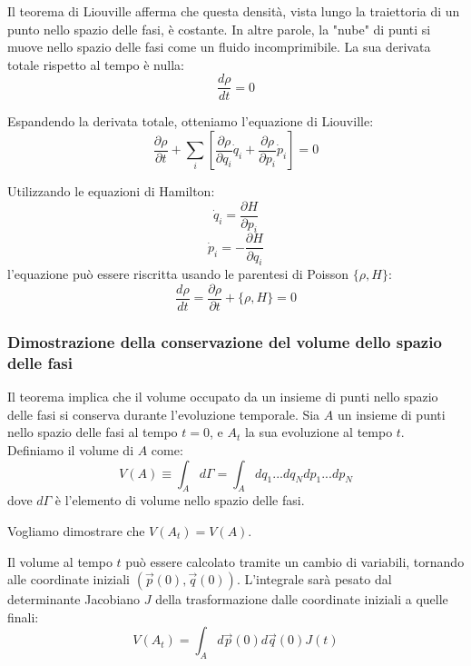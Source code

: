 Il teorema di Liouville afferma che questa densità, vista lungo la traiettoria di un punto nello spazio delle fasi, è costante. In altre parole, la "nube" di punti si muove nello spazio delle fasi come un fluido incomprimibile. La sua derivata totale rispetto al tempo è nulla:
\begin{equation}
    \frac{d\rho}{dt} = 0
    \label{eq:derivata_totale_rho}
\end{equation}

Espandendo la derivata totale, otteniamo l'equazione di Liouville:
\begin{equation}
    \frac{\partial\rho}{\partial t} + \sum_{i} \left[ \frac{\partial\rho}{\partial q_i}\dot{q}_i + \frac{\partial\rho}{\partial p_i}\dot{p}_i \right] = 0
    \label{eq:liouville_espansa}
\end{equation}

Utilizzando le equazioni di Hamilton:
\begin{equation}
    \dot{q}_i = \frac{\partial H}{\partial p_i}
    \label{eq:hamilton_q}
\end{equation}
\begin{equation}
    \dot{p}_i = -\frac{\partial H}{\partial q_i}
    \label{eq:hamilton_p}
\end{equation}
l'equazione può essere riscritta usando le parentesi di Poisson $\{\rho, H\}$:
\begin{equation}
    \frac{d\rho}{dt} = \frac{\partial\rho}{\partial t} + \{\rho, H\} = 0
    \label{eq:liouville_poisson}
\end{equation}

\subsubsection{Dimostrazione della conservazione del volume dello spazio delle fasi}

Il teorema implica che il volume occupato da un insieme di punti nello spazio delle fasi si conserva durante l'evoluzione temporale. Sia $A$ un insieme di punti nello spazio delle fasi al tempo $t=0$, e $A_t$ la sua evoluzione al tempo $t$. Definiamo il volume di $A$ come:
\begin{equation}
    V(A) \equiv \int_A d\Gamma = \int_A dq_1...dq_N dp_1...dp_N
    \label{eq:volume_A}
\end{equation}
dove $d\Gamma$ è l'elemento di volume nello spazio delle fasi.

Vogliamo dimostrare che $V(A_t) = V(A)$.

Il volume al tempo $t$ può essere calcolato tramite un cambio di variabili, tornando alle coordinate iniziali $(\vec{p}(0), \vec{q}(0))$. L'integrale sarà pesato dal determinante Jacobiano $J$ della trasformazione dalle coordinate iniziali a quelle finali:
\begin{equation}
    V(A_t) = \int_A d\vec{p}(0) d\vec{q}(0) J(t)
    \label{eq:volume_At}
\end{equation}

